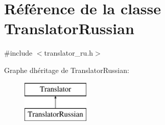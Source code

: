 \hypertarget{class_translator_russian}{}\section{Référence de la classe Translator\+Russian}
\label{class_translator_russian}


{\ttfamily \#include $<$translator\+\_\+ru.\+h$>$}

Graphe d\textquotesingle{}héritage de Translator\+Russian\+:\begin{figure}[H]
\begin{center}
\leavevmode
\includegraphics[height=2.000000cm]{class_translator_russian}
\end{center}
\end{figure}
